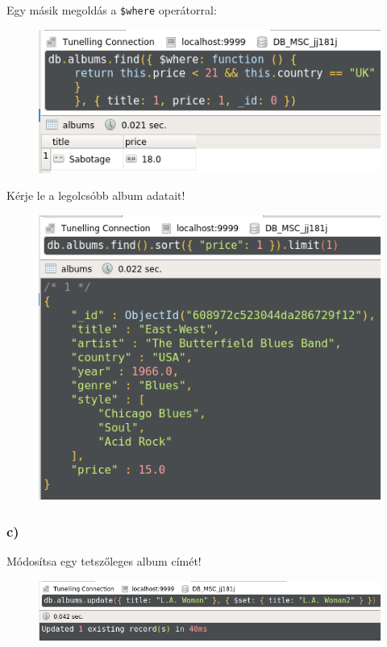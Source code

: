 \documentclass[a4paper, 12pt]{article}
\begin{document}
\noindent Egy másik megoldás a \texttt{\$where} operátorral:
\begin{figure}[!hb]
	\centering
	\includegraphics[scale = 0.55]{images/1_b3.png}
	\label{fig:1_b3}
\end{figure}

\noindent Kérje le a legolcsóbb album adatait!
\begin{figure}[!hb]
	\centering
	\includegraphics[scale = 0.55]{images/1_b4.png}
	\label{fig:1_b4}
\end{figure}	
\clearpage
\subsubsection*{c)}
\noindent Módosítsa egy tetszőleges album címét!
\begin{figure}[!hb]
	\centering
	\includegraphics[scale = 0.6]{images/1_c1.png}
	\label{fig:1_c1}
\end{figure}	
\end{document}
